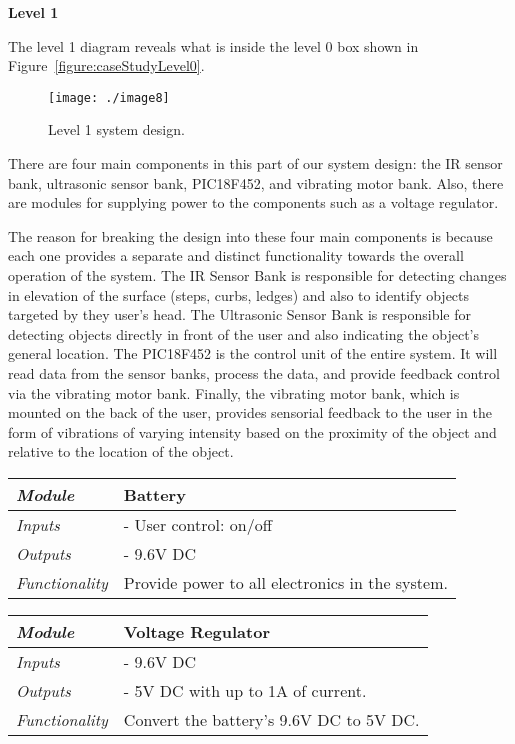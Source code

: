 \textbf{Level 1}

The level 1 diagram reveals what is inside the level 0 box shown in
Figure~\ref{figure:caseStudyLevel0}.

\begin{figure}
\texttt{[image: ./image8]}
\caption{ Level 1 system design.}
\label{figurecaseStudyLevel1:}
\end{figure}


There are four main components in this part of our system design: the IR
sensor bank, ultrasonic sensor bank, PIC18F452, and vibrating motor
bank. Also, there are modules for supplying power to the components such
as a voltage regulator.

The reason for breaking the design into these four main components is
because each one provides a separate and distinct functionality towards
the overall operation of the system. The IR Sensor Bank is responsible
for detecting changes in elevation of the surface (steps, curbs, ledges)
and also to identify objects targeted by they user's head. The
Ultrasonic Sensor Bank is responsible for detecting objects directly in
front of the user and also indicating the object's general location. The
PIC18F452 is the control unit of the entire system. It will read data
from the sensor banks, process the data, and provide feedback control
via the vibrating motor bank. Finally, the vibrating motor bank, which
is mounted on the back of the user, provides sensorial feedback to the
user in the form of vibrations of varying intensity based on the
proximity of the object and relative to the location of the object.

\begin{table}
\begin{tabular}{|m{2cm}|m{10cm}|} \\ \hline
\emph{Module} & Battery \\ \hline
\emph{Inputs} & - User control: on/off \\ \hline
\emph{Outputs} & - 9.6V DC \\ \hline
\emph{Functionality} & Provide power to all electronics in the system. \\ \hline
\end{tabular}
\end{table}


\begin{table}
\begin{tabular}{|m{2cm}|m{10cm}|} \\ \hline
\emph{Module} & Voltage Regulator \\  \hline
\emph{Inputs} & - 9.6V DC \\ \hline
\emph{Outputs} & - 5V DC with up to 1A of current. \\ \hline
\emph{Functionality} & Convert the battery's 9.6V DC to 5V DC. \\ \hline
\end{tabular}
\end{table}

